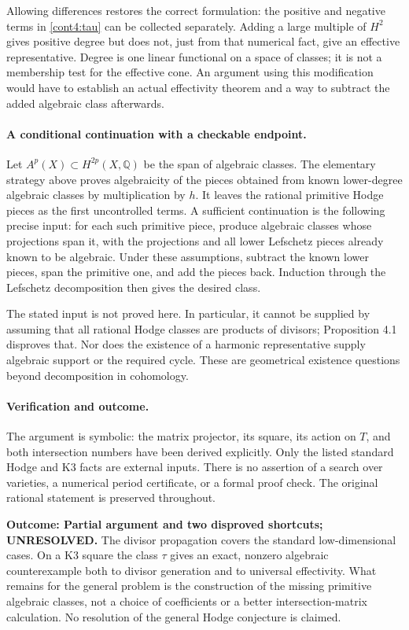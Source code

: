 \documentclass[11pt]{article}
\begin{document}
Allowing differences restores the correct formulation: the positive
and negative terms in \eqref{cont4:tau} can be collected separately.
Adding a large multiple of $H^2$ gives positive degree but does not, just
from that numerical fact, give an effective representative. Degree is
one linear functional on a space of classes; it is not a membership test
for the effective cone. An argument using this modification would have
to establish an actual effectivity theorem and a way to subtract the
added algebraic class afterwards.

\paragraph{A conditional continuation with a checkable endpoint.}
Let $A^p(X)\subset H^{2p}(X,\mathbb Q)$ be the span of algebraic classes.
The elementary strategy above proves algebraicity of the pieces obtained
from known lower-degree algebraic classes by multiplication by $h$.
It leaves the rational primitive Hodge pieces as the first uncontrolled
terms. A sufficient continuation is the following precise input: for
each such primitive piece, produce algebraic classes whose projections
span it, with the projections and all lower Lefschetz pieces already
known to be algebraic. Under these assumptions, subtract the known
lower pieces, span the primitive one, and add the pieces back. Induction
through the Lefschetz decomposition then gives the desired class.

The stated input is not proved here. In particular, it cannot be supplied
by assuming that all rational Hodge classes are products of divisors;
Proposition 4.1 disproves that. Nor does the existence of a harmonic
representative supply algebraic support or the required cycle. These
are geometrical existence questions beyond decomposition in cohomology.

\paragraph{Verification and outcome.}
The argument is symbolic: the matrix projector, its square, its action
on $T$, and both intersection numbers have been derived explicitly.
Only the listed standard Hodge and K3 facts are external inputs. There
is no assertion of a search over varieties, a numerical period
certificate, or a formal proof check. The original rational statement
is preserved throughout.

\textbf{Outcome: Partial argument and two disproved shortcuts; UNRESOLVED.}
The divisor propagation covers the standard low-dimensional cases.
On a K3 square the class $\tau$ gives an exact, nonzero algebraic
counterexample both to divisor generation and to universal effectivity.
What remains for the general problem is the construction of the missing
primitive algebraic classes, not a choice of coefficients or a better
intersection-matrix calculation. No resolution of the general Hodge
conjecture is claimed.
\end{document}
